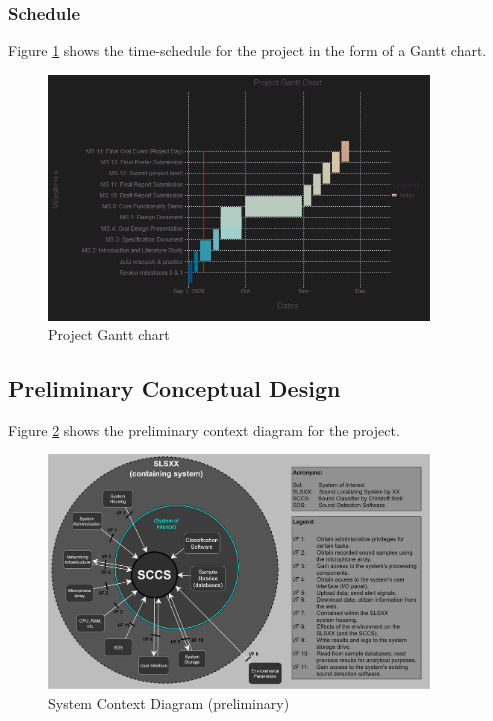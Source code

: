 \documentclass[a4paper,12pt]{article}
\numberwithin{equation}{section}
\numberwithin{figure}{section}
\numberwithin{table}{section}
\begin{document}

\subsubsection{Schedule}
Figure \ref{gantt_chart} shows the time-schedule for the project in the form of a Gantt chart.

\begin{figure}[h!]
    \centering %
    \includegraphics[padding=1ex,width=0.9\textwidth,frame]{img/gantt_chart.png}
    \caption{Project Gantt chart}
    \label{gantt_chart}
\end{figure}



\subsection{Preliminary Conceptual Design}\label{section_prelimConceptDesign}

Figure \ref{prelim_scd} shows the preliminary context diagram for the project.

\begin{figure}[h!]
    \centering %
    \includegraphics[padding=1ex,width=0.9\textwidth,frame]{img/prelim_scd.png}
    \caption{System Context Diagram (preliminary)}
    \label{prelim_scd}
\end{figure}
\end{document}
